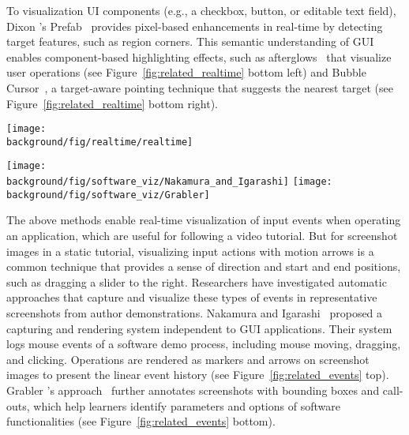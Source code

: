 To visualization UI components (e.g., a checkbox, button, or editable text field), Dixon \ea{}'s Prefab~\cite{Dixon:2010fb,Dixon:2011:CHP:1978942.1979086} provides pixel-based enhancements in real-time by detecting target features, such as region corners. This semantic understanding of GUI enables component-based highlighting effects, such as afterglows~\cite{Baudisch:2006:PET:1166253.1166280} that visualize user operations (see Figure~\ref{fig:related_realtime} bottom left) and Bubble Cursor~\cite{Grossman:2005:BCE:1054972.1055012}, a target-aware pointing technique that suggests the nearest target (see Figure~\ref{fig:related_realtime} bottom right).

\begin{figure*}[t!]
  \centering
  \texttt{[image: \\background/fig/realtime/realtime]}
  \caption{Real-time visual enhancements on GUI applications: (top) Mouseposé highlights mouse cursors or keyboard input; (bottom) Prefab~\cite{Dixon:2010fb} performs reverse engineering to identify UI components and enable real-time visualizations during author operations, such as afterglow~\cite{Baudisch:2006:PET:1166253.1166280} and target-aware~\cite{Grossman:2005:BCE:1054972.1055012} effects.}
  \label{fig:related_realtime}
\end{figure*}

\begin{figure*}[t!]
  \centering
  \texttt{[image: \\background/fig/software\_viz/Nakamura\_and\_Igarashi]}
  \texttt{[image: \\background/fig/software\_viz/Grabler]}
  \caption{Example screenshots that visualize mouse operations are automatically rendered, including (top) mouse move, drag, click, and wheel (a-d) by Nakamura and Igarashi~\cite{Nakamura:2008:ASV:1449715.1449721} and (bottom) application-specific operations (a-b), parameters (c-f), and manipulations (g-h) by Grabler \ea{}~\cite{Grabler:2009jj}.}
  \label{fig:related_events}
\end{figure*}

The above methods enable real-time visualization of input events when operating an application, which are useful for following a video tutorial. But for screenshot images in a static tutorial, visualizing input actions with motion arrows is a common technique that provides a sense of direction and start and end positions, such as dragging a slider to the right.
%
Researchers have investigated automatic approaches that capture and visualize these types of events in representative screenshots from author demonstrations. Nakamura and Igarashi~\cite{Nakamura:2008:ASV:1449715.1449721} proposed a capturing and rendering system independent to GUI applications. Their system logs mouse events of a software demo process, including mouse moving, dragging, and clicking. Operations are rendered as markers and arrows on screenshot images to present the linear event history (see Figure~\ref{fig:related_events} top).
%
Grabler \ea{}'s approach~\cite{Grabler:2009jj} further annotates screenshots with bounding boxes and call-outs, which help learners identify parameters and options of software functionalities (see Figure~\ref{fig:related_events} bottom).

